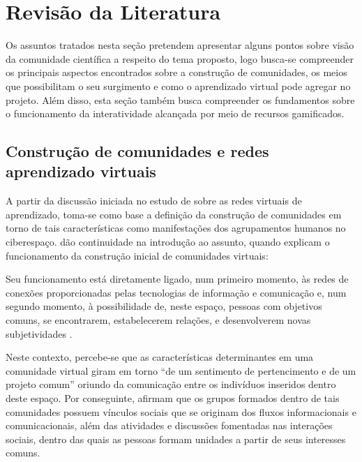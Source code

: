\chapter{Revisão da Literatura}
Os assuntos tratados nesta seção pretendem apresentar alguns pontos sobre visão da comunidade científica a respeito do tema proposto, logo  busca-se compreender os principais aspectos encontrados sobre a construção de comunidades, os meios que possibilitam o seu surgimento e como o aprendizado virtual pode agregar no projeto. Além disso, esta seção também busca compreender os fundamentos sobre o funcionamento da interatividade alcançada por meio de recursos gamificados.
\section{Construção de comunidades e redes aprendizado virtuais}

A partir da discussão iniciada no estudo de  sobre as redes virtuais de aprendizado, toma-se como base a definição da construção de comunidades em torno de tais características como manifestações dos agrupamentos humanos no ciberespaço.  dão continuidade na introdução ao assunto, quando explicam o funcionamento da construção inicial de comunidades virtuais:
\begin{citacao}

Seu funcionamento está diretamente ligado, num primeiro momento, às redes de conexões proporcionadas pelas tecnologias de informação e comunicação e, num segundo momento, à possibilidade de, neste espaço, pessoas com objetivos comuns, se encontrarem, estabelecerem relações, e desenvolverem novas subjetividades \cite{sartori2004comunidades}.

\end{citacao}

Neste contexto, percebe-se que as características determinantes em uma comunidade virtual giram em torno ``de um sentimento de pertencimento e de um projeto comum'' oriundo da comunicação entre os indivíduos inseridos dentro deste espaço. Por conseguinte,  afirmam que os grupos formados dentro de tais comunidades possuem vínculos sociais que se originam dos fluxos informacionais e comunicacionais, além das atividades e discussões fomentadas nas interações sociais, dentro das quais as pessoas formam unidades a partir de seus interesses comuns. 

